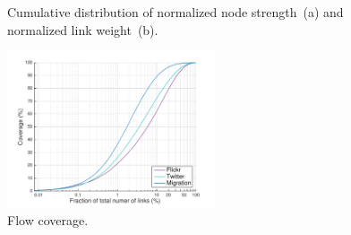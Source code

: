 \documentclass[aps,superscriptaddress,showkeys,nofootinbib]{revtex4-1}
\begin{document}
\begin{figure}[t]
\centering
{}
\caption{\label{fig::cumulative}Cumulative distribution of normalized node strength~(a) and normalized link weight~(b).}
\end{figure}

\begin{figure}[b]
\centering
\includegraphics[width=0.55\textwidth]{flow_coverage-eps-converted-to.pdf}
\caption{\label{fig::flowCoverage} Flow coverage.}
\end{figure}
\end{document}
